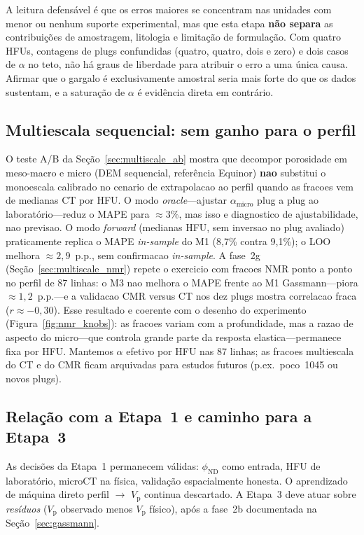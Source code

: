\documentclass[11pt,a4paper]{article}
\numberwithin{equation}{section}
\newcommand{\phiND}{\ensuremath{\phi_{\mathrm{ND}}}}
\newcommand{\Vp}{\ensuremath{V_{\mathrm{p}}}}
\begin{document}
A leitura defensável é que os erros maiores se concentram nas unidades com
menor ou nenhum suporte experimental, mas que esta etapa \textbf{não separa}
as contribuições de amostragem, litologia e limitação de formulação.
Com quatro HFUs, contagens de plugs confundidas (quatro, quatro, dois e zero)
e dois casos de $\alpha$ no teto, não há graus de liberdade para atribuir o
erro a uma única causa.
Afirmar que o gargalo é exclusivamente amostral seria mais forte do que os
dados sustentam, e a saturação de $\alpha$ é evidência direta em contrário.

\subsection{Multiescala sequencial: sem ganho para o perfil}

O teste A/B da Seção~\ref{sec:multiscale_ab} mostra que decompor porosidade
em meso-macro e micro (DEM sequencial, referência Equinor) \textbf{nao}
substitui o monoescala calibrado no cenario de extrapolacao ao perfil quando
as fracoes vem de medianas CT por HFU.
O modo \emph{oracle}---ajustar $\alpha_{\mathrm{micro}}$ plug a plug ao
laboratório---reduz o MAPE para $\approx 3\%$, mas isso e diagnostico de
ajustabilidade, nao previsao.
O modo \emph{forward} (medianas HFU, sem inversao no plug avaliado)
praticamente replica o MAPE \emph{in-sample} do M1 (8,7\% contra 9,1\%); o LOO
melhora $\approx 2{,}9$~p.p., sem confirmacao \emph{in-sample}.
A fase~2g (Seção~\ref{sec:multiscale_nmr}) repete o exercicio com fracoes NMR
ponto a ponto no perfil de 87 linhas: o M3 nao melhora o MAPE frente ao M1
Gassmann---piora $\approx 1{,}2$~p.p.---e a validacao CMR versus CT nos dez
plugs mostra correlacao fraca ($r \approx -0{,}30$).
Esse resultado e coerente com o desenho do experimento
(Figura~\ref{fig:nmr_knobs}): as fracoes variam com a profundidade, mas a
razao de aspecto do micro---que controla grande parte da resposta
elastica---permanece fixa por HFU.
Mantemos $\alpha$ efetivo por HFU nas 87 linhas; as fracoes
multiescala do CT e do CMR ficam arquivadas para estudos futuros (p.ex.\ poco~1045
ou novos plugs).

\subsection{Relação com a Etapa~1 e caminho para a Etapa~3}

As decisões da Etapa~1 permanecem válidas: \phiND{} como entrada, HFU de
laboratório, microCT na física, validação espacialmente honesta.
O aprendizado de máquina direto perfil $\rightarrow$ \Vp{} continua
descartado.
A Etapa~3 deve atuar sobre \emph{resíduos} (\Vp{} observado menos \Vp{}
físico), após a fase~2b documentada na Seção~\ref{sec:gassmann}.
\end{document}
